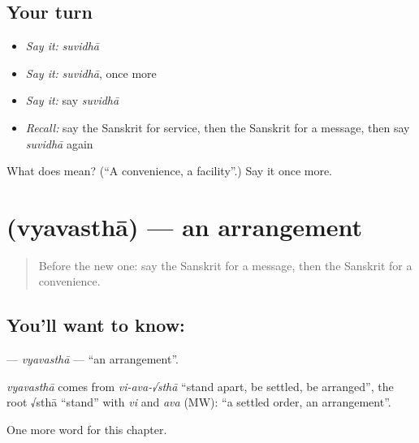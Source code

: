 \subsection*{Your turn}
\begin{itemize}
\raggedright
  \item \emph{Say it:} \emph{suvidhā}
  \item \emph{Say it:} \emph{suvidhā}, once more
  \item \emph{Say it:} say \emph{suvidhā}
  \item \emph{Recall:} say the Sanskrit for service, then the Sanskrit for a message, then say \emph{suvidhā} again
\end{itemize}

\begin{tcolorbox}[breakable,colback=teal!4,colframe=teal!35!black,title={Before you move on}]
What does  mean? (\textquotedblleft{}A convenience, a facility\textquotedblright{}.) Say it once more.
\end{tcolorbox}
\section[\texorpdfstring{\sk{व्यवस्था} (vyavasthā)}{व्यवस्था (vyavasthā)}]{ (vyavasthā) — an arrangement}

\label{lesson:SA-C171-vyavastha}



\begin{quote}
Before the new one: say the Sanskrit for a message, then the Sanskrit for a convenience.
\end{quote}

\subsection*{You'll want to know: }
\textbf{} — \emph{vyavasthā} — \textquotedblleft{}an arrangement\textquotedblright{}.

\begin{cousinweb}
\emph{vyavasthā} comes from \emph{vi-ava-√sthā} \textquotedblleft{}stand apart, be settled, be arranged\textquotedblright{}, the root √sthā \textquotedblleft{}stand\textquotedblright{} with \emph{vi} and \emph{ava} (MW): \textquotedblleft{}a settled order, an arrangement\textquotedblright{}.
\end{cousinweb}

\begin{grammarlens}[title={What you've built}]
One more word for this chapter.
\end{grammarlens}

